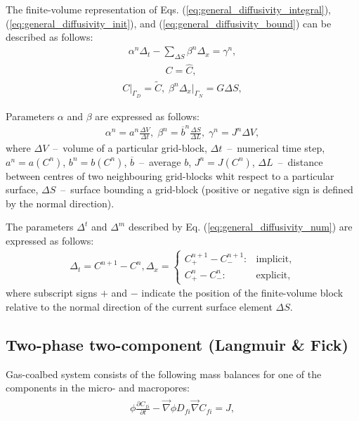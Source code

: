 \documentclass[a4paper,14pt,english]{extreport}
\begin{document}
The finite-volume representation of Eqs. (\ref{eq:general_diffusivity_integral}), (\ref{eq:general_diffusivity_init}), and (\ref{eq:general_diffusivity_bound}) can be described as follows:
    \begin{eqnarray}
        \label{eq:general_diffusivity_num}
        \alpha^n \Delta_{t} - \sum_{\Delta S} \beta^n\Delta_{x} = \gamma^n,
    \end{eqnarray}
    \begin{eqnarray}
         \label{eq:general_diffusivity_num_init}
        C = \hat{C}, \; 
    \end{eqnarray}
    \begin{eqnarray}
    \label{eq:general_diffusivity_num_bound}
    C \Big|_{\mathit{\Gamma}_D}= \tilde{C}, \; \beta^n\Delta_x \Big|_{\mathit{\Gamma}_N} = G\Delta S,
    \end{eqnarray}

Parameters $\alpha$ and $\beta$ are expressed as follows:
    \begin{eqnarray}
        \label{eq:general_alpha_beta_gamma}
        \alpha^n = a^n\frac{\Delta V}{\Delta t}, \;
        \beta^n = \overline{b}^n\frac{\Delta S}{\Delta L}, \; \gamma^n = J^n \Delta V,
    \end{eqnarray}
where $\Delta V$~--~volume of a particular grid-block, $\Delta t$~--~numerical time step, $a^n = a\left(C^n\right)$, $b^n = b\left(C^n\right)$, $\overline{b}$~--~average $b$, $J^n=J\left(C^n\right)$, $\Delta L$~--~distance between centres of two neighbouring grid-blocks whit respect to a particular surface, $\Delta S$~--~surface bounding a grid-block (positive or negative sign is defined by the normal direction).

The parameters $\Delta^{t}$ and $\Delta^{m}$ described by Eq. (\ref{eq:general_diffusivity_num}) are expressed as follows:
    \begin{eqnarray}
    \label{eq:delta_num}
    \Delta_t = C^{n+1} - C^{n}, \Delta_x = \begin{cases}
    C_{+}^{n+\mathit1} - C_{-}^{n+\mathit1} : &\text{implicit},\\
        C_{+}^{n} - C_{-}^{n} : &\text{explicit},
    \end{cases}
    \end{eqnarray}
where subscript signs $+$ and $-$ indicate the position of the finite-volume block relative to the normal direction of the current surface element $\Delta S$.

\subsection*{Two-phase two-component (Langmuir \& Fick)}
Gas-coalbed system consists of the following mass balances for one of the components in the micro- and macropores:
\begin{eqnarray}
\begin{gathered}
\label{eq:multiphase_free_diffusivity_differential}
\phi \frac{\partial C_{fi}}{\partial t}  - \vec{\nabla} \phi D_{fi} \vec{\nabla}C_{fi} = J,
\end{gathered}
\end{eqnarray}
\end{document}
